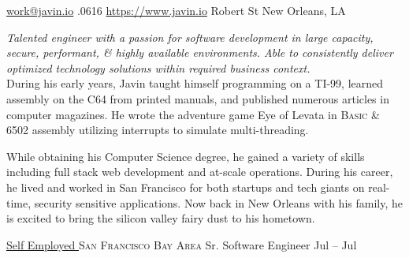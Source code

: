 \documentclass[10pt,a4paper]{article}
\begin{document}
\sloppy  %



\nobreakvspace{0.3em}  %

\noindent\href{mailto:work.at.javin.io}{work\mbox{}@\mbox{}javin.io}\sbull
{}.0616\sbull
\href{https://www.javin.io}{https://www.javin.io} Robert St\sbull
New Orleans, LA

\spacedhrule{0.6em}{-0.4em}  %


\vspace{-1.3em}  %
\begin{multicols}{2}  %
\noindent \emph{Talented engineer with a passion for software development in large capacity, secure, performant, \& highly available environments. Able to consistently deliver optimized technology solutions within required business context. }
\vspace{0.3em}
\\
{During his early years, Javin taught himself programming on a TI-99, learned assembly on the C64 from printed manuals, and published numerous articles in computer magazines. He wrote the adventure game Eye of Levata in {\textsc{Basic}} \& 6502 assembly utilizing interrupts to simulate multi-threading.
}

{While obtaining his Computer Science degree, he gained a variety of skills including full stack web development and at-scale operations. During his career, he lived and worked in San Francisco for both startups and tech giants on real-time, security sensitive applications. Now back in New Orleans with his family, he is excited to bring the silicon valley fairy dust to his hometown. }

\end{multicols}


\spacedhrule{0em}{-0.5em}


\headedsection
  {\href{http://www.javin.io}{Self Employed }}
  {\textsc{San Francisco Bay Area}} {
  \headedsubsection
    {Sr. Software Engineer}
    {Jul  -- Jul }
    {}
}
\end{document}
